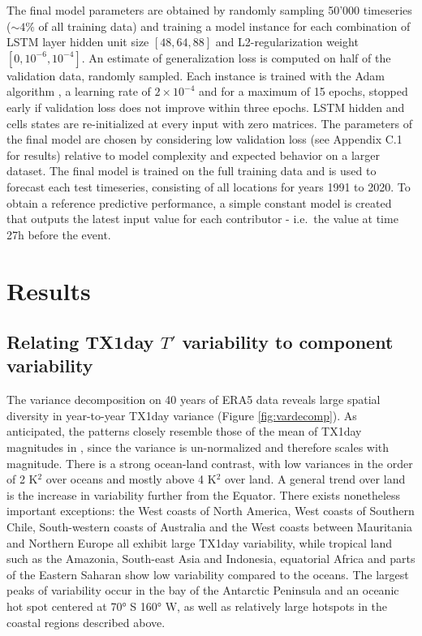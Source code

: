 \documentclass[11pt,a4paper,twoside,openright]{report}
\theoremstyle{definition}
\begin{document}
The final model parameters are obtained by randomly sampling 50'000 timeseries (\(\sim 4\%\) of all training data) and training a model instance for each combination of LSTM layer hidden unit size \([48,64,88]\) and L2-regularization weight \([0,10^{-6},10^{-4}]\). An estimate of generalization loss is computed on half of the validation data, randomly sampled. Each instance is trained with the Adam algorithm \citep{kingma_adam_2017}, a learning rate of \(2\times 10^{-4}\) and for a maximum of 15 epochs, stopped early if validation loss does not improve within three epochs. LSTM hidden and cells states are re-initialized at every input with zero matrices. The parameters of the final model are chosen by considering low validation loss (see Appendix C.1 for results) relative to model complexity and expected behavior on a larger dataset. The final model is trained on the full training data and is used to forecast each test timeseries, consisting of all locations for years 1991 to 2020. To obtain a reference predictive performance, a simple constant model is created that outputs the latest input value for each contributor - i.e.~the value at time 27h before the event.

\chapter{Results}\label{results}

\section{\texorpdfstring{Relating TX1day \(T'\) variability to component variability}{Relating TX1day T\textquotesingle{} variability to component variability}}\label{relating-tx1day-t-variability-to-component-variability}

The variance decomposition on 40 years of ERA5 data reveals large spatial diversity in year-to-year TX1day variance (Figure \ref{fig:vardecomp}). As anticipated, the patterns closely resemble those of the mean of TX1day magnitudes in \citep{rothlisberger_quantifying_2023}, since the variance is un-normalized and therefore scales with magnitude. There is a strong ocean-land contrast, with low variances in the order of 2 K\(^2\) over oceans and mostly above 4 K\(^2\) over land. A general trend over land is the increase in variability further from the Equator. There exists nonetheless important exceptions: the West coasts of North America, West coasts of Southern Chile, South-western coasts of Australia and the West coasts between Mauritania and Northern Europe all exhibit large TX1day variability, while tropical land such as the Amazonia, South-east Asia and Indonesia, equatorial Africa and parts of the Eastern Saharan show low variability compared to the oceans. The largest peaks of variability occur in the bay of the Antarctic Peninsula and an oceanic hot spot centered at 70° S 160° W, as well as relatively large hotspots in the coastal regions described above.
\end{document}
